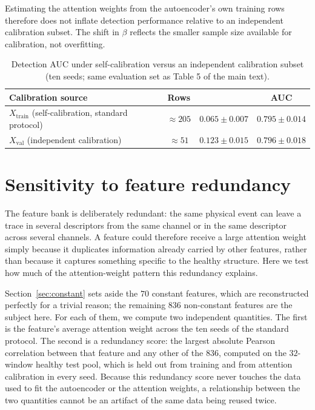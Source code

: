 \documentclass[11pt,a4paper]{article}
\begin{document}
Estimating the attention weights from the autoencoder's own training rows
therefore does not inflate detection performance relative to an independent
calibration subset. The shift in $\beta$ reflects the smaller sample size
available for calibration, not overfitting.

\begin{table}[htbp]
\centering
\caption{Detection AUC under self-calibration versus an independent
calibration subset (ten seeds; same evaluation set as Table 5 of the main
text).}
\label{tab:calibration}
\small
\begin{tabular}{@{}lccc@{}}
\toprule
\textbf{Calibration source} & \textbf{Rows} & \boldmath{$\beta$} & \textbf{AUC} \\
\midrule
$X_{\text{train}}$ (self-calibration, standard protocol) & $\approx 205$ & $0.065 \pm 0.007$ & $0.795 \pm 0.014$ \\
$X_{\text{val}}$ (independent calibration)                & $\approx 51$  & $0.123 \pm 0.015$ & $0.796 \pm 0.018$ \\
\bottomrule
\end{tabular}
\end{table}

\section{Sensitivity to feature redundancy}
\label{sec:redundancy}

The feature bank is deliberately redundant: the same physical event can leave
a trace in several descriptors from the same channel or in the same
descriptor across several channels. A feature could therefore receive a
large attention weight simply because it duplicates information already
carried by other features, rather than because it captures something
specific to the healthy structure. Here we test how much of the
attention-weight pattern this redundancy explains.

Section~\ref{sec:constant} sets aside the $70$ constant features, which are
reconstructed perfectly for a trivial reason; the remaining $836$
non-constant features are the subject here. For each of them, we compute two
independent quantities. The first is the feature's average attention weight across the
ten seeds of the standard protocol. The second is a redundancy score: the
largest absolute Pearson correlation between that feature and any other of
the $836$, computed on the $32$-window healthy test pool, which is held out
from training and from attention calibration in every seed. Because this
redundancy score never touches the data used to fit the autoencoder or the
attention weights, a relationship between the two quantities cannot be an
artifact of the same data being reused twice.
\end{document}
